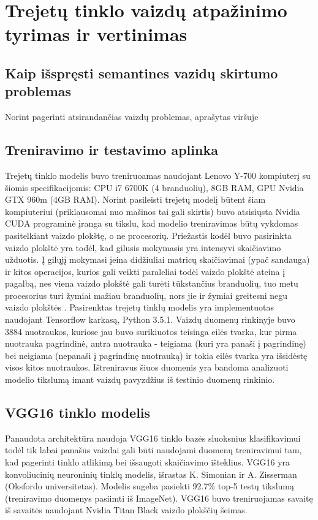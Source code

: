 \documentclass{VUMIFPSkursinis}
\begin{document}
\section{Trejetų tinklo vaizdų atpažinimo tyrimas ir vertinimas}
\subsection{Kaip išspręsti semantines vazidų skirtumo problemas}
Norint pagerinti atsirandančias vaizdų problemas, aprašytas viršuje

\subsection{Treniravimo ir testavimo aplinka}
Trejetų tinklo modelis buvo treniruoamas naudojant Lenovo Y-700 kompiuterį su šiomis specifikacijomis: CPU i7 6700K (4 branduolių), 8GB RAM, GPU Nvidia GTX 960m (4GB RAM). Norint pasileisti trejetų modelį būtent šiam kompiuteriui (priklausomai nuo mašinos tai gali skirtis) buvo atsisiųsta Nvidia CUDA programinė įranga su tikslu, kad modelio treniravimas būtų vykdomas pasitelkiant vaizdo plokštę, o ne procesorių.
\newline
Priežastis kodėl buvo pasirinkta vaizdo plokštė yra todėl, kad gilusis mokymasis yra intensyvi skaičiavimo užduotis. Į gilųjį mokymasi įeina didžiuliai matricų skaičiavimai (ypač sandauga) ir kitos operacijos, kurios gali veikti paraleliai todėl vaizdo plokštė ateina į pagalbą, nes viena vaizdo plokštė gali turėti tūkstančius branduolių, tuo metu procesorius turi žymiai mažiau branduolių, nors jie ir žymiai greitesni negu vaizdo plokštės \cite{Performance_of_GPU}.
\newline
Pasirenktas trejetų tinklų modelis yra implementuotas naudojant Tensorflow karkasą, Python 3.5.1.
\newline
Vaizdų duomenų rinkinyje buvo 3884 nuotraukos, kuriose jau buvo surikiuotos teisinga eilės tvarka, kur pirma nuotrauka pagrindinė, antra nuotrauka - teigiama (kuri yra panaši į pagrindinę) bei neigiama (nepanaši į pagrindinę nuotrauką) ir tokia eilės tvarka yra išsidėstę visos kitos nuotraukos.
Ištreniravus šiuos duomenis yra bandoma analizuoti modelio tikslumą imant vaizdų pavyzdžius iš testinio duomenų rinkinio.

\subsection{VGG16 tinklo modelis}
Panaudota architektūra naudoja VGG16 tinklo bazės sluoksnius klasifikavimui todėl tik labai panašūs vaizdai gali būti naudojami duomenų treniravimui tam, kad pagerinti tinklo atlikimą bei išsaugoti skaičiavimo išteklius.
\newline
VGG16 yra konvoliucinių neuroninių tinklų modelis, išrastas K. Simonian ir A. Zisserman (Oksfordo universitetas). Modelis sugeba pasiekti 92.7\% top-5 testų tikslumą (treniravimo duomenys pasiimti iš ImageNet). VGG16 buvo treniruojamas savaitę iš savaitės naudojant Nvidia Titan Black vaizdo plokščių šeimas.
\end{document}
